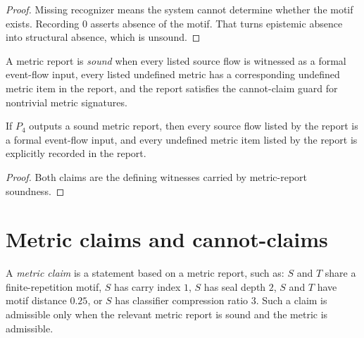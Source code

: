 \begin{proof}
Missing recognizer means the system cannot determine whether the motif exists. Recording $0$ asserts absence of the motif. That turns epistemic absence into structural absence, which is unsound.
\end{proof}

\begin{definition}
\label{def:metric-report-soundness}
A metric report is \emph{sound} when every listed source flow is witnessed as a formal event-flow input, every listed undefined metric has a corresponding undefined metric item in the report, and the report satisfies the cannot-claim guard for nontrivial metric signatures.
\end{definition}

\begin{theorem}
\label{thm:metric-report-sound-report}
If $P_4$ outputs a sound metric report, then every source flow listed by the report is a formal event-flow input, and every undefined metric item listed by the report is explicitly recorded in the report.
\end{theorem}

\begin{proof}
Both claims are the defining witnesses carried by metric-report soundness.
\end{proof}

\section{Metric claims and cannot-claims}
\label{sec:metric-report-claims-cannot-claims}

\begin{definition}
\label{def:metric-report-claim}
A \emph{metric claim} is a statement based on a metric report, such as: $S$ and $T$ share a finite-repetition motif, $S$ has carry index $1$, $S$ has seal depth $2$, $S$ and $T$ have motif distance $0.25$, or $S$ has classifier compression ratio $3$. Such a claim is admissible only when the relevant metric report is sound and the metric is admissible.
\end{definition}

